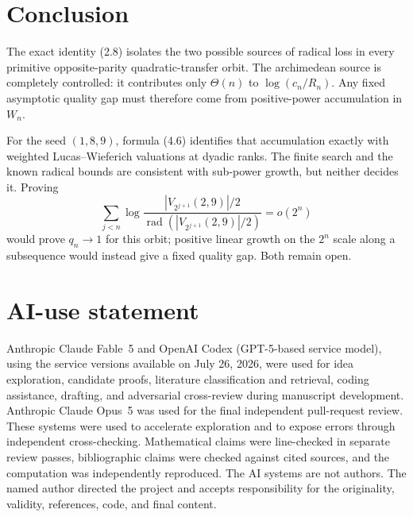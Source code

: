 \documentclass[11pt]{article}
\theoremstyle{remark}
\newcommand{\rad}{\operatorname{rad}}
\begin{document}
\section{Conclusion}

The exact identity (2.8) isolates the two possible sources of radical
loss in every primitive opposite-parity quadratic-transfer orbit.  The
archimedean source is completely controlled: it contributes only
\(\Theta(n)\) to \(\log(c_n/R_n)\).  Any fixed asymptotic quality gap
must therefore come from positive-power accumulation in \(W_n\).

For the seed \((1,8,9)\), formula (4.6) identifies that accumulation
exactly with weighted Lucas--Wieferich valuations at dyadic ranks.  The
finite search and the known radical bounds are consistent with
sub-power growth, but neither decides it.  Proving
\[
 \sum_{j<n}\log\frac{|V_{2^{j+1}}(2,9)|/2}
                         {\rad(|V_{2^{j+1}}(2,9)|/2)}
 =o(2^n)
\]
would prove \(q_n\to1\) for this orbit; positive linear growth on the
\(2^n\) scale along a subsequence would instead give a fixed quality
gap.  Both remain open.

\section*{AI-use statement}

Anthropic Claude Fable~5 and OpenAI Codex (GPT-5-based service model),
using the service versions available on July 26, 2026, were used for
idea exploration, candidate proofs, literature classification and
retrieval, coding assistance, drafting, and adversarial cross-review
during manuscript development.  Anthropic Claude Opus~5 was used for
the final independent pull-request review.  These systems were used to
accelerate exploration and to expose errors through independent
cross-checking.  Mathematical claims were
line-checked in separate review passes, bibliographic claims were
checked against cited sources, and the computation was independently
reproduced.  The AI systems are not authors.  The named author directed
the project and accepts responsibility for the originality, validity,
references, code, and final content.
\end{document}
